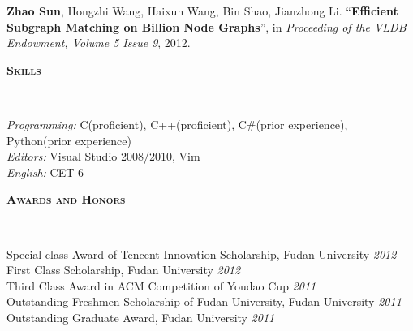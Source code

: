 \documentclass[9pt]{article}
\newenvironment{changemargin}[2]{%
  \begin{list}{}{%
    \setlength{\topsep}{0pt}%
    \setlength{\leftmargin}{#1}%
    \setlength{\rightmargin}{#2}%
    \setlength{\listparindent}{\parindent}%
    \setlength{\itemindent}{\parindent}%
    \setlength{\parsep}{\parskip}%
  }%
  \item[]}{\end{list}
}
\newcommand{\lineover}{
	\begin{changemargin}{-0.05in}{-0.05in}
		\vspace*{-8pt}
		\hrulefill \\
		\vspace*{-2pt}
	\end{changemargin}
}
\newcommand{\header}[1]{
	\begin{changemargin}{-0.5in}{-0.5in}
		\scshape{#1}\\
  	\lineover
	\end{changemargin}
}
\newenvironment{body} {
	\vspace*{-16pt}
	\begin{changemargin}{-0.25in}{-0.5in}
  }	
	{\end{changemargin}
}
\begin{document}
\begin{body}
	\vspace{14pt}
	\textbf{Zhao Sun}, Hongzhi Wang, Haixun Wang, Bin Shao, Jianzhong Li. ``\textbf{Efficient Subgraph Matching on Billion Node Graphs}'', in \emph{Proceeding of the VLDB Endowment, Volume 5 Issue 9}, 2012.\\
\end{body}
\smallskip


\header{\textbf{Skills}}

\begin{body}
	\vspace{14pt}
	\emph{Programming:}{} C(proficient), C++(proficient), C\#(prior experience), Python(prior experience)\\
    \medskip
    \emph{Editors:}{} Visual Studio 2008/2010, Vim\\
    \medskip
    \emph{English:}{} CET-6
\end{body}
\smallskip


%
%


\header{\textbf{Awards and Honors}}

\begin{body}
	\vspace{14pt}
    Special-class Award of Tencent Innovation Scholarship, Fudan University \hfill{} \emph{2012}\\
    \smallskip
    First Class Scholarship, Fudan University \hfill{} \emph{2012}\\
    \smallskip
    Third Class Award in ACM Competition of Youdao Cup  \hfill{} \emph{2011}\\
    \smallskip
    Outstanding Freshmen Scholarship of Fudan University, Fudan University \hfill{} \emph{2011}\\
    \smallskip
    Outstanding Graduate Award, Fudan University \hfill{} \emph{2011}\\
	\smallskip	
\end{body}
\end{document}
